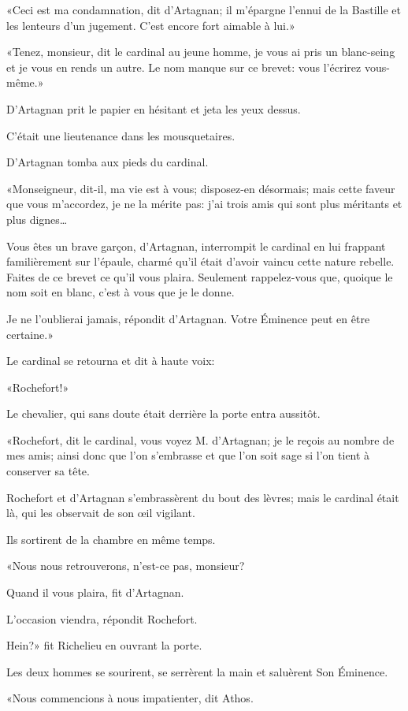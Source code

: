 «Ceci est ma condamnation, dit d'Artagnan; il m'épargne l'ennui de la Bastille et les lenteurs d'un jugement. C'est encore fort aimable à lui.» 

«Tenez, monsieur, dit le cardinal au jeune homme, je vous ai pris un blanc-seing et je vous en rends un autre. Le nom manque sur ce brevet: vous l'écrirez vous-même.» 

D'Artagnan prit le papier en hésitant et jeta les yeux dessus. 

C'était une lieutenance dans les mousquetaires. 

D'Artagnan tomba aux pieds du cardinal. 

«Monseigneur, dit-il, ma vie est à vous; disposez-en désormais; mais cette faveur que vous m'accordez, je ne la mérite pas: j'ai trois amis qui sont plus méritants et plus dignes\dots 

\speak  Vous êtes un brave garçon, d'Artagnan, interrompit le cardinal en lui frappant familièrement sur l'épaule, charmé qu'il était d'avoir vaincu cette nature rebelle. Faites de ce brevet ce qu'il vous plaira. Seulement rappelez-vous que, quoique le nom soit en blanc, c'est à vous que je le donne. 

\speak  Je ne l'oublierai jamais, répondit d'Artagnan. Votre Éminence peut en être certaine.» 

Le cardinal se retourna et dit à haute voix: 

«Rochefort!» 

Le chevalier, qui sans doute était derrière la porte entra aussitôt. 

«Rochefort, dit le cardinal, vous voyez M. d'Artagnan; je le reçois au nombre de mes amis; ainsi donc que l'on s'embrasse et que l'on soit sage si l'on tient à conserver sa tête. 

Rochefort et d'Artagnan s'embrassèrent du bout des lèvres; mais le cardinal était là, qui les observait de son œil vigilant. 

Ils sortirent de la chambre en même temps. 

«Nous nous retrouverons, n'est-ce pas, monsieur? 

\speak  Quand il vous plaira, fit d'Artagnan. 

\speak  L'occasion viendra, répondit Rochefort. 

\speak  Hein?» fit Richelieu en ouvrant la porte. 

Les deux hommes se sourirent, se serrèrent la main et saluèrent Son Éminence. 

«Nous commencions à nous impatienter, dit Athos. 


